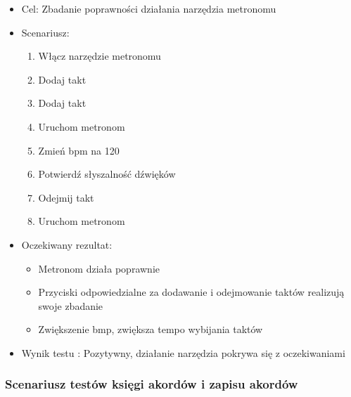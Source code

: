 \begin{itemize}
    \item Cel: Zbadanie poprawności działania narzędzia metronomu
    \item Scenariusz:
        \begin{enumerate}
            \item Włącz narzędzie metronomu
            \item Dodaj takt 
            \item Dodaj takt
            \item Uruchom metronom
            \item Zmień bpm na 120
            \item Potwierdź słyszalność dźwięków
            \item Odejmij takt
            \item Uruchom metronom
        \end{enumerate}
    \item Oczekiwany rezultat:
        \begin{itemize}
            \item Metronom działa poprawnie
            \item Przyciski odpowiedzialne za dodawanie i odejmowanie taktów realizują swoje zbadanie
            \item Zwiększenie bmp, zwiększa tempo wybijania taktów
        \end{itemize}
    \item Wynik testu : Pozytywny, działanie narzędzia pokrywa się z oczekiwaniami
\end{itemize}

\subsubsection{Scenariusz testów księgi akordów i zapisu akordów}

